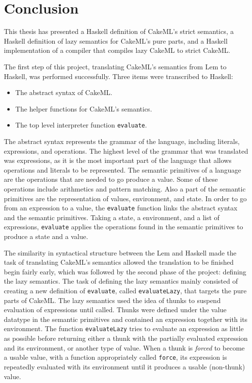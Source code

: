\chapter{Conclusion}
This thesis has presented a Haskell definition of CakeML's strict semantics,
a Haskell definition of lazy semantics for CakeML's pure parts, and a Haskell
implementation of a compiler that compiles lazy CakeML to strict CakeML.

The first step of this project, translating CakeML's semantics from Lem to
Haskell, was performed successfully. Three items were transcribed to Haskell:

\begin{itemize}
\item The abstract syntax of CakeML.
\item The helper functions for CakeML's semantics.
\item The top level interpreter function \texttt{evaluate}.
\end{itemize}
The abstract syntax represents the grammar of the language, including literals,
expressions, and operations. The highest level of the grammar that was
translated was expressions, as it is the most important part of the language
that allows operations and literals to be represented.
The semantic primitives of a language are the operations that are needed
to go produce a value. Some of these operations include arithmetics and
pattern matching. Also a part of the semantic primitives are the representation
of values, environment, and state.
In order to go from an expression to a value, the \texttt{evaluate} function
links the abstract syntax and the semantic primitives. Taking a state,
a environment, and a list of expressions, \texttt{evaluate} applies the
operations found in the semantic primitives to produce a state and a value.

The similarity in syntactical structure between the Lem and Haskell made the
task of translating CakeML's semantics allowed the translation to be finished
begin fairly early, which was followed by the second phase of the project:
defining the lazy semantics. The task of defining the lazy semantics mainly
consisted of creating a new definition of \texttt{evaluate}, called
\texttt{evaluateLazy}, that targets the pure parts of CakeML.
The lazy semantics used the idea of thunks to suspend
evaluation of expressions until called. Thunks were defined under the value
datatype in the semantic primitives and contained an expression together with
its environment. The function \texttt{evaluateLazy} tries to evaluate an
expression as little as possible before returning either a thunk with the
partially evaluated expression and its environment, or another type of value.
When a thunk is \textit{forced} to become a usable value, with a function
appropriately called \texttt{force}, its expression is repeatedly evaluated with
its environment until it produces a usable (non-thunk) value.

